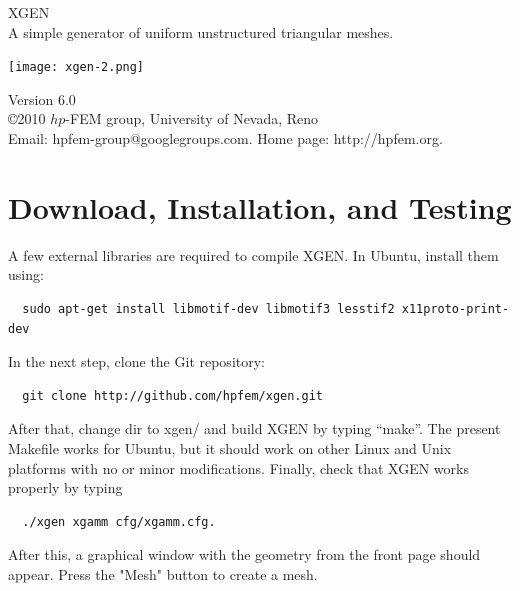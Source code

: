\documentclass[12pt]{article}
\begin{document}
  \begin{titlepage}
  \begin{center}
\vbox{}

    \vspace{30mm}

    {\Huge  XGEN}\\[6mm]

A simple generator of uniform unstructured triangular meshes.

    \vspace{20mm}

\begin{center}
\texttt{[image: xgen-2.png]}
\end{center}
    \vspace{20mm}

    Version 6.0\\
    \copyright 2010 $hp$-FEM group, University of Nevada, Reno\\
    Email: hpfem-group@googlegroups.com. Home page: http://hpfem.org.

  \end{center}
  \end{titlepage}

  \section{Download, Installation, and Testing} \label{getting}
  
  A few external libraries are required to compile XGEN. In Ubuntu, install them using:

{\footnotesize
\begin{verbatim}
  sudo apt-get install libmotif-dev libmotif3 lesstif2 x11proto-print-dev
\end{verbatim}
}
\noindent
  In the next step, clone the Git repository:
{\footnotesize
\begin{verbatim}
  git clone http://github.com/hpfem/xgen.git
\end{verbatim}
}
\noindent
\normalsize
  After that, change dir to xgen/ and build XGEN by typing ``make''. The present 
  Makefile works for Ubuntu, but it should work on other Linux and Unix 
  platforms with no or minor modifications. Finally, check that XGEN works
  properly by typing 
 \noindent
{\footnotesize
\begin{verbatim}
  ./xgen xgamm cfg/xgamm.cfg.
\end{verbatim}
} 
\noindent
After this, a graphical window with the geometry from the front page 
should appear. Press the "Mesh" button to create a mesh.
\end{document}
